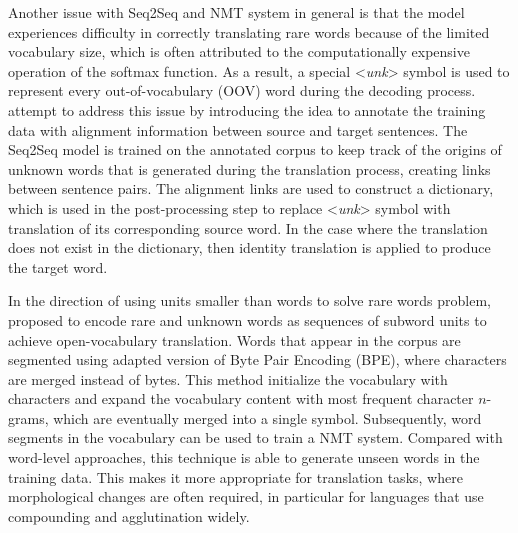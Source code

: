 \documentclass[12pt]{extarticle}
\begin{document}
Another issue with Seq2Seq and NMT system in general is that the model experiences difficulty in correctly translating rare words because of the limited vocabulary size, which is often attributed to the computationally expensive operation of the softmax function. As a result, a special  \textless \textit{unk}\textgreater{} symbol is used to represent every out-of-vocabulary (OOV) word during the decoding process. \citep{luong-etal-2015-addressing} attempt to address this issue by introducing the idea to annotate the training data with alignment information between source and target sentences. The Seq2Seq model is trained on the annotated corpus to keep track of the origins of unknown words that is generated during the translation process, creating links between sentence pairs. The alignment links are used to construct a dictionary, which is used in the post-processing step to replace \textless \textit{unk}\textgreater{} symbol with translation of its corresponding source word. In the case where the translation does not exist in the dictionary, then identity translation is applied to produce the target word.

In the direction of using units smaller than words to solve rare words problem, \citep{sennrich-etal-2016-neural} proposed to encode rare and unknown words as sequences of subword units to achieve open-vocabulary translation. Words that appear in the corpus are segmented using adapted version of Byte Pair Encoding (BPE), where characters are merged instead of bytes. This method initialize the vocabulary with characters and expand the vocabulary content with most frequent character $n$-grams, which are eventually merged into a single symbol. Subsequently, word segments in the vocabulary can be used to train a NMT system. Compared with word-level approaches, this technique is able to generate unseen words in the training data. This makes it more appropriate for translation tasks, where morphological changes are often required, in particular for languages that use compounding and agglutination widely.
\end{document}
